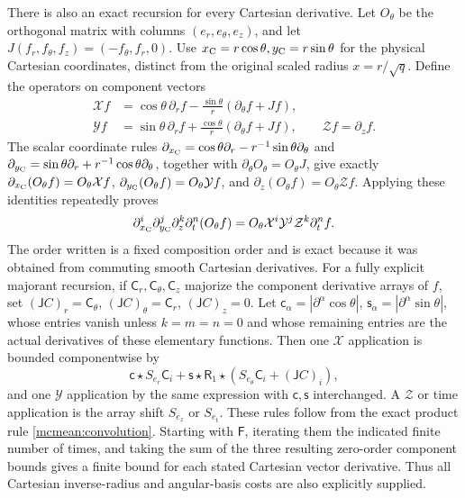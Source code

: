 \documentclass[11pt]{article}
\begin{document}
There is also an exact recursion for every Cartesian derivative.
Let \(O_\theta\) be the orthogonal matrix with columns
\((e_r,e_\theta,e_z)\), and let
\(J(f_r,f_\theta,f_z)=(-f_\theta,f_r,0)\). Use
\(x_{\rm C}=r\cos\theta,y_{\rm C}=r\sin\theta\) for the physical
Cartesian coordinates, distinct from the original scaled radius
\(x=r/\sqrt q\). Define the operators on component vectors
\begin{equation}\label{mcmean:cartesian_recursion}
\begin{split}
 \mathcal Xf&=\cos\theta\,\partial_rf
        -\frac{\sin\theta}{r}(\partial_\theta f+Jf),\\
 \mathcal Yf&=\sin\theta\,\partial_rf
        +\frac{\cos\theta}{r}(\partial_\theta f+Jf),
 \qquad \mathcal Zf=\partial_zf.
\end{split}
\end{equation}
The scalar coordinate rules
\(\partial_{x_{\rm C}}=\cos\theta\partial_r
-r^{-1}\sin\theta\partial_\theta\) and
\(\partial_{y_{\rm C}}=\sin\theta\partial_r
+r^{-1}\cos\theta\partial_\theta\), together with
\(\partial_\theta O_\theta=O_\theta J\), give exactly
\(\partial_{x_{\rm C}}(O_\theta f)=O_\theta\mathcal Xf\),
\(\partial_{y_{\rm C}}(O_\theta f)=O_\theta\mathcal Yf\), and
\(\partial_z(O_\theta f)=O_\theta\mathcal Zf\).
Applying these identities repeatedly proves
\[
 \partial_{x_{\rm C}}^i\partial_{y_{\rm C}}^j
 \partial_z^k\partial_t^n(O_\theta f)
   =O_\theta\mathcal X^i\mathcal Y^j\mathcal Z^k\partial_t^nf.
\]
The order written is a fixed composition order and is exact because
it was obtained from commuting smooth Cartesian derivatives.
For a fully explicit majorant recursion, if \(\mathsf C_r,
\mathsf C_\theta,\mathsf C_z\) majorize the component derivative
arrays of \(f\), set \((\mathsf J C)_r=\mathsf C_\theta\),
\((\mathsf J C)_\theta=\mathsf C_r\),
\((\mathsf J C)_z=0\). Let \(\mathsf c_\alpha
=|\partial^\alpha\cos\theta|\),
\(\mathsf s_\alpha=|\partial^\alpha\sin\theta|\), whose entries
vanish unless \(k=m=n=0\) and whose remaining entries are the
actual derivatives of these elementary functions. Then one
\(\mathcal X\) application is bounded componentwise by
\[
 \mathsf c\star S_{e_r}\mathsf C_i
 +\mathsf s\star\mathsf R_1\star
             (S_{e_\theta}\mathsf C_i+(\mathsf J C)_i),
\]
and one \(\mathcal Y\) application by the same expression with
\(\mathsf c,\mathsf s\) interchanged. A \(\mathcal Z\) or time
application is the array shift \(S_{e_z}\) or \(S_{e_t}\).
These rules follow from the exact product rule
\eqref{mcmean:convolution}. Starting with \(\mathsf F\), iterating
them the indicated finite number of times, and taking the sum of
the three resulting zero-order component bounds gives a finite bound
for each stated Cartesian vector derivative. Thus all Cartesian
inverse-radius and angular-basis costs are also explicitly supplied.
\end{document}
